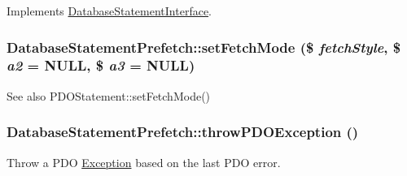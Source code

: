 Implements \hyperlink{interfaceDatabaseStatementInterface_a97657e1cf89c6e1700f7bfa0e90deaf5}{DatabaseStatementInterface}.\hypertarget{classDatabaseStatementPrefetch_a98cfac25b6be286e48f942d4b0d0d880}{
\subsubsection[{setFetchMode}]{\setlength{\rightskip}{0pt plus 5cm}DatabaseStatementPrefetch::setFetchMode (\$ {\em fetchStyle}, \/  \$ {\em a2} = {\ttfamily NULL}, \/  \$ {\em a3} = {\ttfamily NULL})}}
\label{classDatabaseStatementPrefetch_a98cfac25b6be286e48f942d4b0d0d880}
\begin{DoxySeeAlso}{See also}
PDOStatement::setFetchMode() 
\end{DoxySeeAlso}
\hypertarget{classDatabaseStatementPrefetch_a07a6febdb1ad94b1ee66b926fad800b2}{
\subsubsection[{throwPDOException}]{\setlength{\rightskip}{0pt plus 5cm}DatabaseStatementPrefetch::throwPDOException ()}}
\label{classDatabaseStatementPrefetch_a07a6febdb1ad94b1ee66b926fad800b2}
Throw a PDO \hyperlink{classException}{Exception} based on the last PDO error. 

